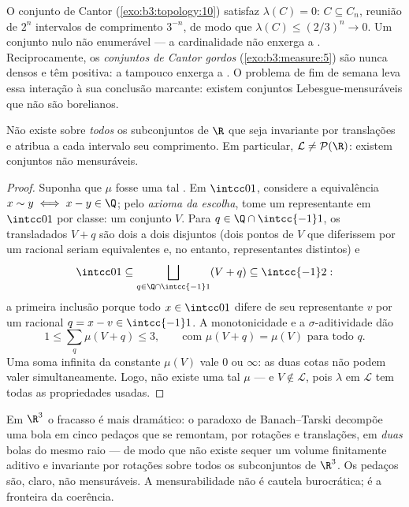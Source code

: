 \begin{example}\label{ex:b3:measure:cantor}
O conjunto de Cantor (\cref{exo:b3:topology:10}) satisfaz $\lambda(C) = 0$: $C \subseteq C_n$, reunião de
$2^n$ intervalos de comprimento $3^{-n}$, de modo que $\lambda(C) \leq (2/3)^n \to 0$. Um
conjunto nulo não enumerável --- a cardinalidade não enxerga a .
Reciprocamente, os \emph{conjuntos de Cantor gordos}
(\cref{exo:b3:measure:5}) são nunca densos e têm  positiva: a 
tampouco enxerga a . O problema de fim de semana leva essa
interação à sua conclusão marcante: existem conjuntos
Lebesgue-mensuráveis que não são borelianos.
\end{example}

\begin{theorem}[Vitali]\label{thm:b3:measure:vitali}
Não existe  sobre \emph{todos} os subconjuntos de $\R$ que
seja invariante por translações e atribua a cada intervalo seu
comprimento. Em particular, $\mathcal L \neq \mathcal P(\R)$: existem conjuntos não
mensuráveis.
\end{theorem}

\begin{proof}
Suponha que $\mu$ fosse uma tal . Em $\intcc01$, considere a
equivalência $x \sim y \iff x - y \in \Q$; pelo \emph{axioma da escolha}, tome um
representante em $\intcc01$ por classe: um conjunto $V$. Para $q \in \Q\cap\intcc{-1}1$, os
transladados $V + q$ são dois a dois disjuntos (dois pontos de
$V$ que diferissem por um racional seriam equivalentes e, no
entanto, representantes distintos) e
\[
\intcc01 \subseteq \bigsqcup_{q \in \Q\cap\intcc{-1}1}(V + q)
\subseteq \intcc{-1}2 :
\]
a primeira inclusão porque todo $x \in \intcc01$ difere de seu representante
$v$ por um racional $q = x - v \in
\intcc{-1}1$. A monotonicidade e a
$\sigma$-aditividade dão
\[
1 \leq \sum_{q}\mu(V + q) \leq 3,
\qquad\text{com } \mu(V + q) = \mu(V) \text{ para todo } q .
\]
Uma soma infinita da constante $\mu(V)$ vale $0$ ou
$\infty$: as duas cotas não podem valer simultaneamente. Logo, não
existe uma tal $\mu$ --- e $V
\notin \mathcal L$, pois $\lambda$ em $\mathcal L$ tem todas as
propriedades usadas.
\end{proof}

\begin{remark}\label{rem:b3:measure:banachtarski}
Em $\R^3$ o fracasso é mais dramático: o paradoxo de
Banach--Tarski decompõe uma bola em cinco pedaços que se remontam, por
rotações e translações, em \emph{duas} bolas do mesmo raio --- de modo
que não existe sequer um volume finitamente aditivo e invariante por
rotações sobre todos os subconjuntos de $\R^3$. Os pedaços são,
claro, não mensuráveis. A mensurabilidade não é cautela burocrática; é
a fronteira da coerência.
\end{remark}

